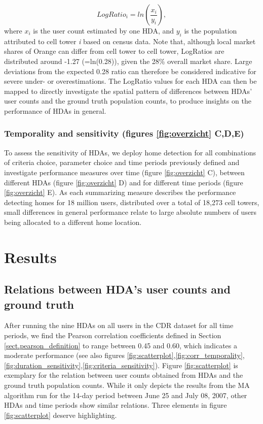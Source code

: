 \documentclass[a4paper]{article}
\begin{document}
\begin{equation}
LogRatio_i =ln(\frac{x_i}{y_i}),
\end{equation}
where $x_i$ is the user count estimated by one HDA, and $y_i$ is the population attributed to cell tower \textit{i} based on census data. Note that, although local market shares of Orange can differ from cell tower to cell tower, LogRatios are distributed around -1.27 (=ln(0.28)), given the 28\% overall market share. Large deviations from the expected 0.28 ratio can therefore be considered indicative for severe under- or overestimations. The LogRatio values for each HDA can then be mapped to directly investigate the spatial pattern of differences between HDAs' user counts and the ground truth population counts, to produce insights on the performance of HDAs in general.



\subsubsection{Temporality and sensitivity (figures \ref{fig:overzicht} C,D,E)}
To assess the sensitivity of HDAs, we deploy home detection for all combinations of criteria choice, parameter choice and time periods previously defined and investigate performance measures over time (figure \ref{fig:overzicht} C), between different HDAs (figure \ref{fig:overzicht} D) and for different time periods (figure \ref{fig:overzicht} E). As each summarizing measure describes the performance detecting homes for 18 million users, distributed over a total of 18,273 cell towers, small differences in general performance relate to large absolute numbers of users being allocated to a different home location.   


\section{Results}\label{sect.results}

\subsection{Relations between HDA's user counts and ground truth}

After running the nine HDAs on all users in the CDR dataset for all time periods, we find the Pearson correlation coefficients defined in Section \ref{sect.pearson_definition} to range between 0.45 and 0.60, which indicates a moderate performance (see also figures \ref{fig:scatterplot},\ref{fig:corr_temporality},\ref{fig:duration_sensitivity},\ref{fig:criteria_sensitivity}). Figure \ref{fig:scatterplot} is exemplary for the relation between user counts obtained from HDAs and the ground truth population counts. While it only depicts the results from the MA algorithm run for the 14-day period between June 25 and July 08, 2007, other HDAs and time periods show similar relations. Three elements in figure \ref{fig:scatterplot} deserve highlighting.
\end{document}
